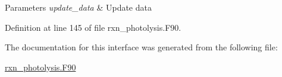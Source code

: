\begin{DoxyParams}{Parameters}
{\em update\+\_\+data} & Update data \\
\hline
\end{DoxyParams}


Definition at line 145 of file rxn\+\_\+photolysis.\+F90.



The documentation for this interface was generated from the following file\+:\begin{DoxyCompactItemize}
\item 
\mbox{\hyperlink{rxn__photolysis_8_f90}{rxn\+\_\+photolysis.\+F90}}\end{DoxyCompactItemize}
